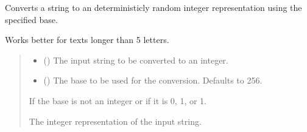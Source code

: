 \documentclass[letterpaper,10pt,english]{sphinxmanual}
\begin{document}

\begin{fulllineitems}
\label{\detokenize{generated/eflatun_uav.helpers.number_generators:eflatun_uav.helpers.number_generators.convert_string_to_int}}
\pysigstartsignatures
{}
\pysigstopsignatures
\sphinxAtStartPar
Converts a string to an deterministicly random integer representation using the specified base.

\sphinxAtStartPar
Works better for texts longer than 5 letters.
\begin{quote}\begin{description}
\begin{itemize}
\item {} 
\sphinxAtStartPar
{} () \textendash{} The input string to be converted to an integer.

\item {} 
\sphinxAtStartPar
{} (\sphinxstyleliteralemphasis{\sphinxupquote{{[}}}\sphinxstyleliteralemphasis{\sphinxupquote{{]}}}\sphinxstyleliteralemphasis{\sphinxupquote{, }}) \textendash{} The base to be used for the conversion. Defaults to 256.

\end{itemize}

\sphinxAtStartPar
{} \textendash{} If the base is not an integer or if it is 0, \sphinxhyphen{}1, or 1.

\sphinxAtStartPar
The integer representation of the input string.


\end{description}
\end{quote}
\end{fulllineitems}
\end{document}
